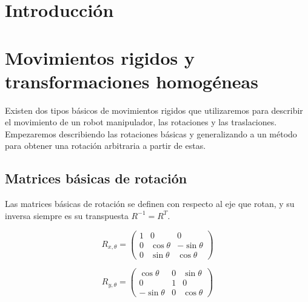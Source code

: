 \begin{multicols*}{3}


    \section{Introducción}


    \section{Movimientos rigidos y transformaciones homogéneas}

        Existen dos tipos básicos de movimientos rigidos que utilizaremos para describir el movimiento de un robot manipulador, las rotaciones y las traslaciones. Empezaremos describiendo las rotaciones básicas y generalizando a un método para obtener una rotación arbitraria a partir de estas.


        \subsection{Matrices básicas de rotación}

            Las matrices básicas de rotación se definen con respecto al eje que rotan, y su inversa siempre es su transpuesta $R^{-1} = R^T$.

            \begin{equation}
                R_{x, \theta} = 
                \begin{pmatrix}
                    1 & 0 & 0 \\
                    0 & \cos{\theta} & -\sin{\theta} \\
                    0 & \sin{\theta} & \cos{\theta}
                \end{pmatrix}
            \end{equation}

            \begin{equation}
                R_{y, \theta} = 
                \begin{pmatrix}
                    \cos{\theta} & 0 & \sin{\theta} \\
                    0 & 1 & 0 \\
                    -\sin{\theta} & 0 & \cos{\theta}
                \end{pmatrix}
            \end{equation}


\end{multicols*}
